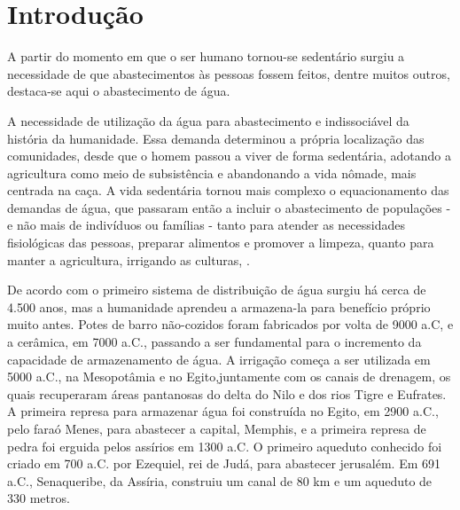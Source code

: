 \documentclass[
	12pt,				%
	openright,			%
	twoside,			%
	a4paper,			%
	english,			%
	french,				%
	spanish,			%
	brazil				%
	]{abntex2}
\begin{document}
\textual

\chapter*[Introdução]{Introdução}


A partir do momento em que o ser humano tornou-se sedentário surgiu a necessidade de que abastecimentos às pessoas fossem feitos, dentre muitos outros, destaca-se aqui o abastecimento de água.

A necessidade de utilização da água para abastecimento e indissociável da história da humanidade. Essa demanda determinou a própria localização das comunidades, desde que o homem passou a viver de forma sedentária, adotando a agricultura como meio de subsistência e abandonando a vida nômade, mais centrada na caça. A vida sedentária tornou mais complexo o equacionamento das demandas de água, que passaram então a
incluir o abastecimento de populações - e não mais de indivíduos ou famílias - tanto para atender as necessidades fisiológicas das pessoas, preparar alimentos e promover a limpeza, quanto para manter a agricultura, irrigando as culturas, .

De acordo com  o primeiro sistema de distribuição de água surgiu há cerca de 4.500 anos, mas a humanidade aprendeu a armazena-la para benefício próprio muito antes. Potes de barro não-cozidos foram fabricados por volta de 9000 a.C, e a cerâmica, em 7000 a.C., passando a ser fundamental para o incremento da capacidade de armazenamento de água. A irrigação começa a ser utilizada em 5000 a.C., na Mesopotâmia e no Egito,juntamente com os canais de drenagem, os quais recuperaram áreas pantanosas do delta do Nilo e dos rios Tigre e Eufrates. A primeira represa para armazenar água foi construída no Egito, em 2900 a.C., pelo faraó Menes, para abastecer a capital, Memphis, e a primeira represa de pedra foi erguida pelos assírios em 1300 a.C. O primeiro aqueduto conhecido foi criado em 700 a.C. por Ezequiel, rei de Judá, para abastecer jerusalém. Em 691 a.C., Senaqueribe, da Assíria, construiu um canal de 80 km e um aqueduto de 330 metros.
\end{document}
